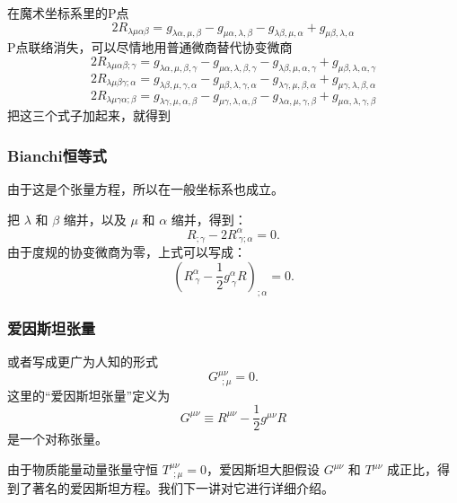 \documentclass[CJK,13pt]{beamer}
\begin{document}
  \begin{frame}
    在魔术坐标系里的P点
    $$2R_{\lambda\mu\alpha\beta}  =g_{\lambda\alpha,\mu,\beta}  -g_{\mu\alpha,\lambda,\beta}-g_{\lambda\beta,\mu,\alpha}+g_{\mu\beta,\lambda,\alpha} $$      
    P点联络消失，可以尽情地用普通微商替代协变微商
    $$ 2R_{\lambda\mu\alpha\beta;\gamma} = g_{\lambda\alpha,\mu,\beta,\gamma}  -g_{\mu\alpha,\lambda,\beta,\gamma}-g_{\lambda\beta,\mu,\alpha,\gamma}+g_{\mu\beta,\lambda,\alpha,\gamma}$$
    $$ 2R_{\lambda\mu\beta\gamma;\alpha} = g_{\lambda\beta,\mu,\gamma,\alpha}  -g_{\mu\beta,\lambda,\gamma,\alpha}-g_{\lambda\gamma,\mu,\beta,\alpha}+g_{\mu\gamma,\lambda,\beta,\alpha}$$    
    $$ 2R_{\lambda\mu\gamma\alpha;\beta} = g_{\lambda\gamma,\mu,\alpha,\beta}  -g_{\mu\gamma,\lambda,\alpha,\beta}-g_{\lambda\alpha,\mu,\gamma,\beta}+g_{\mu\alpha,\lambda,\gamma,\beta}$$    
    把这三个式子加起来，就得到
  \end{frame}


  \begin{frame}
    \frametitle{Bianchi恒等式}
    由于这是个张量方程，所以在一般坐标系也成立。
    
    把 $\lambda$ 和 $\beta$ 缩并，以及 $\mu$ 和 $\alpha$ 缩并，得到：
    $$ R_{;\gamma} - 2R^\alpha_{\ \gamma;\alpha} = 0.$$
    由于度规的协变微商为零，上式可以写成：
    $$ \left(R^\alpha_{\ \gamma}-\frac{1}{2}g^\alpha_{\ \gamma}R\right)_{;\alpha} = 0.$$    
  \end{frame}


  \begin{frame}
    \frametitle{爱因斯坦张量}
    或者写成更广为人知的形式
    {\blue $$ G^{\mu\nu}_{\ \ ;\mu} = 0.$$}    
    这里的“爱因斯坦张量”定义为
    {\blue $$ G^{\mu\nu} \equiv R^{\mu\nu}-\frac{1}{2}g^{\mu\nu}R$$}
    是一个对称张量。

    由于物质能量动量张量守恒 $T^{\mu\nu}_{\ \ ;\mu}=0$，爱因斯坦大胆假设 $G^{\mu\nu}$ 和 $T^{\mu\nu}$ 成正比，得到了著名的爱因斯坦方程。我们下一讲对它进行详细介绍。
  \end{frame}
  
\ech
\end{document}

